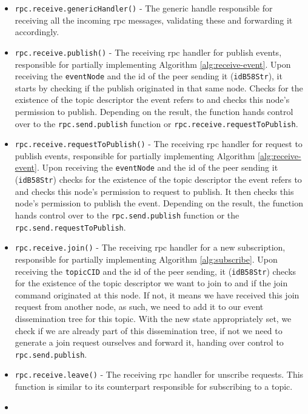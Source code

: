 \begin{itemize}
  \item
    \verb|rpc.receive.genericHandler()| - The generic handle responsible for receiving all the incoming \acrshort{rpc} messages, validating these and forwarding it accordingly.
  \item
    \verb|rpc.receive.publish()| - The receiving \acrshort{rpc} handler for publish events, responsible for partially implementing Algorithm \ref{alg:receive-event}. Upon receiving the \verb|eventNode| and the id of the peer sending it (\verb|idB58Str|), it starts by checking if the publish originated in that same node. Checks for the existence of the topic descriptor the event refers to and checks this node's permission to publish. Depending on the result, the function hands control over to the \verb|rpc.send.publish| function or \verb|rpc.receive.requestToPublish|. 
  \item
    \verb|rpc.receive.requestToPublish()| - The receiving \acrshort{rpc} handler for request to publish events, responsible for partially implementing Algorithm \ref{alg:receive-event}. Upon receiving the \verb|eventNode| and the id of the peer sending it (\verb|idB58Str|) checks for the existence of the topic descriptor the event refers to and checks this node's permission to request to publish. It then checks this node's permission to publish the event. Depending on the result, the function hands control over to the \verb|rpc.send.publish| function or the \verb|rpc.send.requestToPublish|. 
  \item
    \verb|rpc.receive.join()| - The receiving \acrshort{rpc} handler for a new subscription, responsible for partially implementing Algorithm \ref{alg:subscribe}. Upon receiving the \verb|topicCID| and the \acrshort{id} of the peer sending, it (\verb|idB58Str|) checks for the existence of the topic descriptor we want to join to and if the join command originated at this node. If not, it means we have received this join request from another node, as such, we need to add it to our event dissemination tree for this topic. With the new state appropriately set, we check if we are already part of this dissemination tree, if not we need to generate a join request ourselves and forward it, handing over control to \verb|rpc.send.publish|. 
  \item
    \verb|rpc.receive.leave()| - The receiving \acrshort{rpc} handler for unscribe requests. This function is similar to its counterpart responsible for subscribing to a topic.
  \item

\end{itemize}
